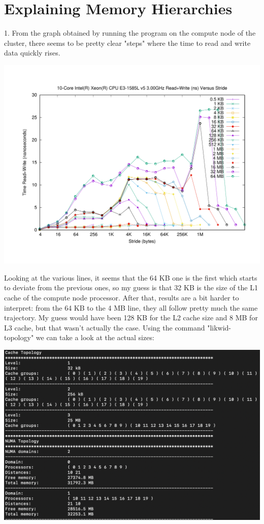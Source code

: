 \documentclass[unicode,11pt,a4paper,oneside,numbers=endperiod,openany]{scrartcl}
\begin{document}
\setassignment
{}

\newline

\section{Explaining Memory Hierarchies }
1. From the graph obtained by running the program on the compute node of the cluster, there seems to be pretty clear "steps" where the time to read and write data quickly rises. 
\begin{center}
\includegraphics[width=0.7\linewidth]{gnuplot_ics_cluster.pdf}
\end{center}
Looking at the various lines, it seems that the 64 KB one is the first which starts to deviate from the previous ones, so my guess is that 32 KB is the size of the L1 cache of the compute node processor.
\newline
After that, results are a bit harder to interpret: from the 64 KB to the 4 MB line, they all follow pretty much the same trajectory. My guess would have been 128 KB for the L2 cache size and 8 MB for L3 cache, but that wasn't actually the case.
\newline
Using the command "likwid-topology" we can take a look at the actual sizes:
\begin{center}
\includegraphics[width=0.6\linewidth]{cache_topology.png}
\end{center}
\end{document}

